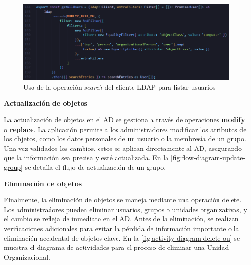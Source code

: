 \begin{figure}[h]
    \centering
    \includegraphics[width=\linewidth]{images/code/getAllUsers.png}
    \caption{Uso de la operación \textit{search} del cliente LDAP para listar usuarios}
    \label{fig:get-all-users}
\end{figure}

\textbf{Actualización de objetos}

La actualización de objetos en el AD se gestiona a través de operaciones \textbf{modify} o \textbf{replace}. La aplicación permite a los administradores modificar los atributos de los objetos, como los datos personales de un usuario o la membresía de un grupo. Una vez validados los cambios, estos se aplican directamente al AD, asegurando que la información sea precisa y esté actualizada. En la \autoref{fig:flow-diagram-update-group} se detalla el flujo de actualización de un grupo.

\textbf{Eliminación de objetos}

Finalmente, la eliminación de objetos se maneja mediante una operación delete. Los administradores pueden eliminar usuarios, grupos o unidades organizativas, y el cambio se refleja de inmediato en el AD. Antes de la eliminación, se realizan verificaciones adicionales para evitar la pérdida de información importante o la eliminación accidental de objetos clave. En la \autoref{fig:activity-diagram-delete-ou} se muestra el diagrama de actividades para el proceso de eliminar una Unidad Organizacional.
